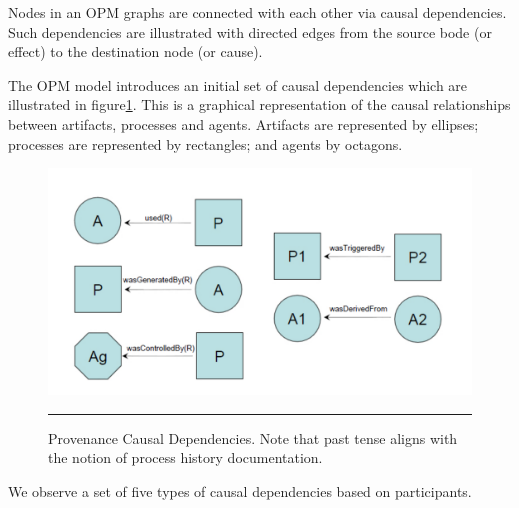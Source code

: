 Nodes in an OPM graphs are connected with each other via causal dependencies. Such dependencies are illustrated with directed edges from the source bode (or effect) to the destination node (or cause).

The OPM model introduces an initial set of causal dependencies which are illustrated in figure\ref{fig:provCausalDependencies}. This is a graphical representation of the causal relationships between artifacts, processes and agents. Artifacts are represented by ellipses; processes are represented by rectangles; and agents by octagons.

\begin{figure}[htbp]
	\centering
		\includegraphics[scale=0.60]{./Figures/chapter2/figure7.pdf}
		\rule{35em}{0.5pt}
	\caption[Provenance Causal Dependencies]{Provenance Causal Dependencies\cite{reference13}. Note that past tense aligns with the notion of process history documentation.}
	\label{fig:provCausalDependencies}
\end{figure}

We observe a set of five types of causal dependencies based on participants.

